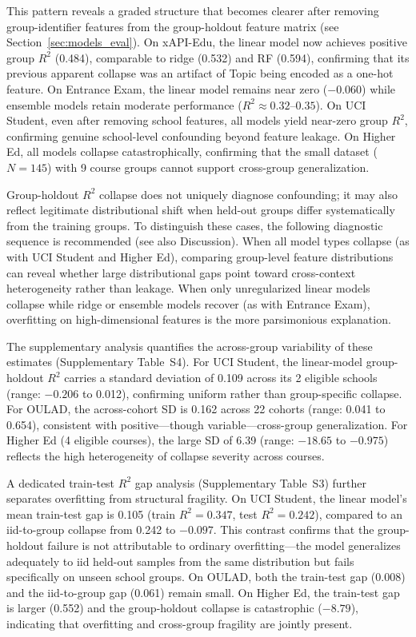 \documentclass[10pt,letterpaper]{wlscirep}
\begin{document}
This pattern reveals a graded structure that becomes clearer after removing group-identifier features from the group-holdout feature matrix (see Section~\ref{sec:models_eval}). On xAPI-Edu, the linear model now achieves positive group $R^2$ (0.484), comparable to ridge (0.532) and RF (0.594), confirming that its previous apparent collapse was an artifact of Topic being encoded as a one-hot feature. On Entrance Exam, the linear model remains near zero ($-0.060$) while ensemble models retain moderate performance ($R^2 \approx 0.32$--$0.35$). On UCI Student, even after removing school features, all models yield near-zero group $R^2$, confirming genuine school-level confounding beyond feature leakage. On Higher Ed, all models collapse catastrophically, confirming that the small dataset ($N=145$) with 9 course groups cannot support cross-group generalization.

Group-holdout $R^2$ collapse does not uniquely diagnose confounding; it may also reflect legitimate distributional shift when held-out groups differ systematically from the training groups. To distinguish these cases, the following diagnostic sequence is recommended (see also Discussion). When all model types collapse (as with UCI Student and Higher Ed), comparing group-level feature distributions can reveal whether large distributional gaps point toward cross-context heterogeneity rather than leakage. When only unregularized linear models collapse while ridge or ensemble models recover (as with Entrance Exam), overfitting on high-dimensional features is the more parsimonious explanation.

The supplementary analysis quantifies the across-group variability of these estimates (Supplementary Table~S4). For UCI Student, the linear-model group-holdout $R^2$ carries a standard deviation of 0.109 across its 2 eligible schools (range: $-0.206$ to 0.012), confirming uniform rather than group-specific collapse. For OULAD, the across-cohort SD is 0.162 across 22 cohorts (range: 0.041 to 0.654), consistent with positive---though variable---cross-group generalization. For Higher Ed (4 eligible courses), the large SD of 6.39 (range: $-18.65$ to $-0.975$) reflects the high heterogeneity of collapse severity across courses.

A dedicated train-test $R^2$ gap analysis (Supplementary Table~S3) further separates overfitting from structural fragility. On UCI Student, the linear model's mean train-test gap is 0.105 (train $R^2 = 0.347$, test $R^2 = 0.242$), compared to an iid-to-group collapse from 0.242 to $-0.097$. This contrast confirms that the group-holdout failure is not attributable to ordinary overfitting---the model generalizes adequately to iid held-out samples from the same distribution but fails specifically on unseen school groups. On OULAD, both the train-test gap (0.008) and the iid-to-group gap (0.061) remain small. On Higher Ed, the train-test gap is larger (0.552) and the group-holdout collapse is catastrophic ($-8.79$), indicating that overfitting and cross-group fragility are jointly present.
\end{document}
